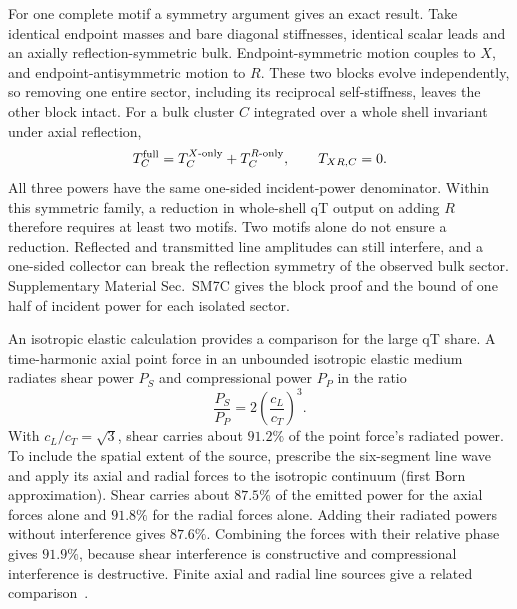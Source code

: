 \documentclass[10pt,aps,onecolumn,floatfix,notitlepage,nofootinbib,showkeys]{revtex4-2}
\begin{document}
For one complete motif a symmetry argument gives an exact result. Take identical endpoint masses and bare diagonal stiffnesses, identical scalar leads and an axially reflection-symmetric bulk. Endpoint-symmetric motion couples to $X$, and endpoint-antisymmetric motion to $R$. These two blocks evolve independently, so removing one entire sector, including its reciprocal self-stiffness, leaves the other block intact. For a bulk cluster $C$ integrated over a whole shell invariant under axial reflection,
\begin{equation}
 T_C^{\rm full}=T_C^{X\text{-only}}+T_C^{R\text{-only}},
 \qquad T_{XR,C}=0.
 \label{eq:s6-one-motif-additivity}
\end{equation}
All three powers have the same one-sided incident-power denominator. Within this symmetric family, a reduction in whole-shell qT output on adding $R$ therefore requires at least two motifs. Two motifs alone do not ensure a reduction. Reflected and transmitted line amplitudes can still interfere, and a one-sided collector can break the reflection symmetry of the observed bulk sector. Supplementary Material Sec.~SM7C gives the block proof and the bound of one half of incident power for each isolated sector.

An isotropic elastic calculation provides a comparison for the large qT share. A time-harmonic axial point force in an unbounded isotropic elastic medium radiates shear power $P_S$ and compressional power $P_P$ in the ratio~\cite{Achenbach1973,Graff1975,Schmidt2018ElasticPurcell}
\begin{equation}
 \frac{P_S}{P_P}=2\left(\frac{c_L}{c_T}\right)^3.
 \label{eq:s6-point-force}
\end{equation}
With $c_L/c_T=\sqrt3$, shear carries about $91.2\%$ of the point force's radiated power. To include the spatial extent of the source, prescribe the six-segment line wave and apply its axial and radial forces to the isotropic continuum (first Born approximation). Shear carries about $87.5\%$ of the emitted power for the axial forces alone and $91.8\%$ for the radial forces alone. Adding their radiated powers without interference gives $87.6\%$. Combining the forces with their relative phase gives $91.9\%$, because shear interference is constructive and compressional interference is destructive. Finite axial and radial line sources give a related comparison~\cite{Aldridge1998}.
\end{document}
